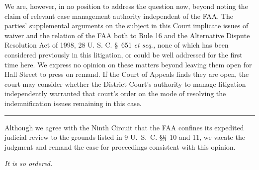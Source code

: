   We are, however, in no position to address the question now, beyond
noting the claim of relevant case management authority independent of
the FAA. The parties' supplemental arguments on the subject in this
Court implicate issues of waiver and the relation of the FAA both to
Rule 16 and the Alternative Dispute Resolution Act of 1998, 28 U. S.
C. \S~651 \emph{et seq.,} none of which has been considered previously
in this litigation, or could be well addressed for the first time here.
We express no opinion on these matters beyond leaving them open for
Hall Street to press on remand. If the Court of Appeals finds they are
open, the court may consider whether the District Court's authority to
manage litigation independently warranted that court's order on the
mode of resolving the indemnification issues remaining in this case.

\hrule

  Although we agree with the Ninth Circuit that the FAA confines its
expedited judicial review to the grounds listed in 9 U.~S.~C.
\S\S~10 and 11, we vacate the judgment and remand the case for
proceedings consistent with this opinion.

\begin{flushright}\emph{It is so ordered.}\end{flushright}
